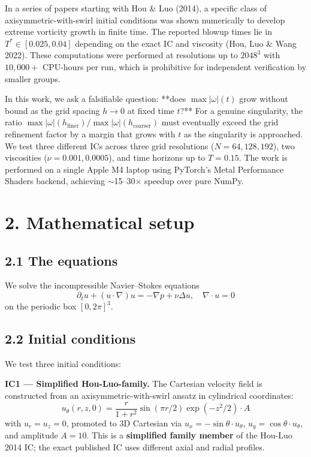 \documentclass[11pt]{article}
\begin{document}
In a series of papers starting with Hou \& Luo (2014), a specific class of
axisymmetric-with-swirl initial conditions was shown numerically to develop
extreme vorticity growth in finite time. The reported blowup times lie in
\(T^* \in [0.025, 0.04]\) depending on the exact IC and viscosity
(Hou, Luo \& Wang 2022). These computations were performed at resolutions
up to \(2048^3\) with \(10{,}000{+}\) CPU-hours per run, which is prohibitive
for independent verification by smaller groups.

In this work, we ask a falsifiable question: **does \(\max|\omega|(t)\) grow
without bound as the grid spacing \(h \to 0\) at fixed time \(t\)?** For a
genuine singularity, the ratio $\max|\omega|(h_{\text{finer}}) /
\max|\omega|(h_{\text{coarser}})$ must eventually exceed the grid
refinement factor by a margin that grows with \(t\) as the singularity is
approached. We test three different ICs across three grid resolutions
(\(N = 64, 128, 192\)), two viscosities (\(\nu = 0.001, 0.0005\)), and time
horizons up to \(T = 0.15\). The work is performed on a single Apple M4
laptop using PyTorch's Metal Performance Shaders backend, achieving
\(\sim\)15–30× speedup over pure NumPy.


\section{2. Mathematical setup}


\subsection*{2.1 The equations}

We solve the incompressible Navier–Stokes equations
\begin{equation*}\partial_t u + (u \cdot \nabla) u = -\nabla p + \nu \Delta u, \quad \nabla \cdot u = 0\end{equation*}
on the periodic box \([0, 2\pi]^3\).


\subsection*{2.2 Initial conditions}

We test three initial conditions:

\textbf{IC1 — Simplified Hou-Luo-family.} The Cartesian velocity field is
constructed from an axisymmetric-with-swirl ansatz in cylindrical
coordinates:
\begin{equation*}u_\theta(r, z, 0) = \frac{r}{1 + r^2} \sin(\pi r / 2) \exp(-z^2 / 2) \cdot A\end{equation*}
with \(u_r = u_z = 0\), promoted to 3D Cartesian via
\(u_x = -\sin\theta \cdot u_\theta\), \(u_y = \cos\theta \cdot u_\theta\), and
amplitude \(A = 10\). This is a \textbf{simplified family member} of the Hou-Luo
2014 IC; the exact published IC uses different axial and radial profiles.
\end{document}
